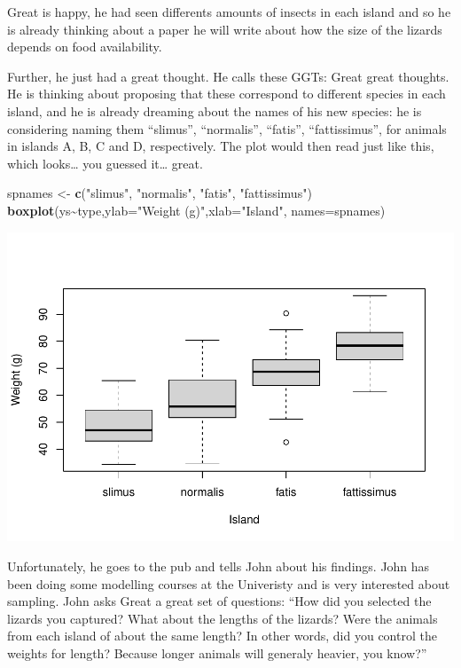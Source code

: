 \documentclass[
]{book}
\newenvironment{Shaded}{\begin{snugshade}}{\end{snugshade}}
\newcommand{\AttributeTok}[1]{\textcolor[rgb]{0.13,0.29,0.53}{#1}}
\newcommand{\FunctionTok}[1]{\textcolor[rgb]{0.13,0.29,0.53}{\textbf{#1}}}
\newcommand{\NormalTok}[1]{#1}
\newcommand{\OtherTok}[1]{\textcolor[rgb]{0.56,0.35,0.01}{#1}}
\newcommand{\SpecialCharTok}[1]{\textcolor[rgb]{0.81,0.36,0.00}{\textbf{#1}}}
\newcommand{\StringTok}[1]{\textcolor[rgb]{0.31,0.60,0.02}{#1}}
\begin{document}
Great is happy, he had seen differents amounts of insects in each island and so he is already thinking about a paper he will write about how the size of the lizards depends on food availability.

Further, he just had a great thought. He calls these GGTs: Great great thoughts. He is thinking about proposing that these correspond to different species in each island, and he is already dreaming about the names of his new species: he is considering naming them ``slimus'', ``normalis'', ``fatis'', ``fattissimus'', for animals in islands A, B, C and D, respectively. The plot would then read just like this, which looks\ldots{} you guessed it\ldots{} great.

\begin{Shaded}
\begin{Highlighting}[]
\NormalTok{spnames }\OtherTok{\textless{}{-}} \FunctionTok{c}\NormalTok{(}\StringTok{"slimus"}\NormalTok{, }\StringTok{"normalis"}\NormalTok{, }\StringTok{"fatis"}\NormalTok{, }\StringTok{"fattissimus"}\NormalTok{)}
\FunctionTok{boxplot}\NormalTok{(ys}\SpecialCharTok{\textasciitilde{}}\NormalTok{type,}\AttributeTok{ylab=}\StringTok{"Weight (g)"}\NormalTok{,}\AttributeTok{xlab=}\StringTok{"Island"}\NormalTok{,}
\AttributeTok{names=}\NormalTok{spnames)}
\end{Highlighting}
\end{Shaded}

\includegraphics{ECOMODbook_files/figure-latex/a10.5-1.pdf}

Unfortunately, he goes to the pub and tells John about his findings. John has been doing some modelling courses at the Univeristy and is very interested about sampling.
John asks Great a great set of questions: ``How did you selected the lizards you captured? What about the lengths of the lizards? Were the animals from each island of about the same length? In other words, did you control the weights for length? Because longer animals will generaly heavier, you know?''
\end{document}

